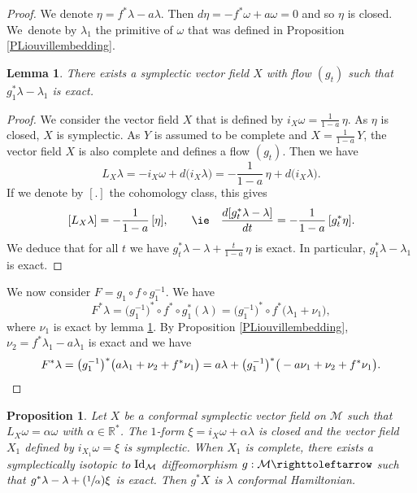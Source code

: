 \documentclass[JEP,XML,SOM,Unicode,published]{cedram}
\newcommand{\Psfrac}[2]{(\sfrac{#1}{#2})}
\newtheorem{lemma}{Lemma}
\newtheorem{proposition}{Proposition}
\theoremstyle{definition}
\def\R{\mathbb{R}}
\def\cM{{\mathcal M}}
\begin{document}
\begin{proof}
We denote $\eta=f^*\lambda-a\lambda$. Then $d\eta=-f^*\omega+a\omega=0$ and so $\eta$ is closed. We~denote by $\lambda_1$ the primitive of $\omega$ that was defined in Proposition \ref{PLiouvillembedding}.

\begin{lemma}\label{L2}
There exists a symplectic vector field $X$ with flow $(g_t)$ such that $g_1^*\lambda-\lambda_1$ is exact.
\end{lemma}

\begin{proof}
We consider the vector field $X$ that is defined by $i_X\omega=\frac{1}{1-a}\,\eta$. As $\eta$ is closed, $X$ is symplectic. As $Y$ is assumed to be complete and $X=\frac{1}{1-a}\,Y$, the vector field $X$ is also complete and defines a flow $(g_t)$. Then we have\vspace*{-3pt}
\[
L_X\lambda=-i_X\omega+d\big(i_X\lambda\big)=-\frac{1}{1-a}\,\eta+d\big(i_X\lambda\big).
\]
If we denote by $[.]$ the cohomology class, this gives\vspace*{-3pt}
\[
[L_X\lambda]=-\frac{1}{1-a}\,[\eta],\qquad
\text{\ie}
\quad
\frac{d[g_t^*\lambda-\lambda]}{dt}=-\frac{1}{1-a}\,[g_t^*\eta].
\]
We deduce that for all $t$ we have
$g_t^*\lambda-\lambda+\frac{t}{1-a}\,\eta$ is exact. In particular, $g^*_1\lambda-\lambda_1$ is exact.
\end{proof}
We now consider $F=g_1\circ f\circ g_1^{-1}$. We have
\[
F^*\lambda=\big(g_1^{-1}\big)^*\circ f^*\circ g_1^*(\lambda)=\big(g_1^{-1}\big)^*\circ f^*\big( \lambda_1 +\nu_1\big),
\]
where $\nu_1$ is exact by lemma \ref{L2}. By Proposition \ref{PLiouvillembedding}, $\nu_2=f^*\lambda_1-a\lambda_1$ is exact and we have
\[
F^*\lambda=\big(g_1^{-1}\big)^* \big( a\lambda_1+\nu_2 + f^*\nu_1\big)=a\lambda+\big(g_1^{-1}\big)^{*}\big(-a\nu_1+\nu_2 + f^*\nu_1\big).\qedhere
\]
\end{proof}

\begin{proposition}\label{PCH}
Let $X$ be a conformal symplectic vector field on $\cM$ such that $L_X\omega=\alpha \omega$ with $\alpha\in\R^*$. The $1$-form $\xi=i_X\omega+\alpha\lambda$ is closed and the vector field $X_1$ defined by $i_{X_1}\omega=\xi$ is symplectic. When $X_1$ is complete, there exists a symplectically isotopic to ${\rm Id}_\cM$ diffeomorphism $g: \cM \righttoleftarrow$ such that $g^*\lambda-\lambda +\Psfrac{1}{\alpha}\xi$ is exact. Then $g^*X$ is $\lambda$ conformal Hamiltonian.
\end{proposition}
\end{document}
